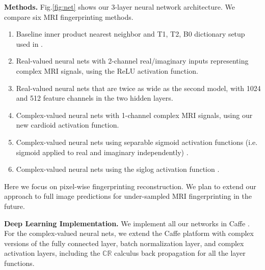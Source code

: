 \documentclass{article}
\begin{document}
{\bf Methods.}  Fig.\ref{fig:net} shows our 3-layer neural network architecture.  We compare six MRI fingerprinting methods.
\begin{enumerate}
\setlength{\itemsep}{0pt}
\item Baseline inner product nearest neighbor and T1, T2, B0 dictionary setup used in \cite{mrf_nature}.
\item Real-valued neural nets with 2-channel real/imaginary inputs representing complex MRI signals, using the ReLU activation function.
\item Real-valued neural nets that are twice as wide as the second model, with 1024 and 512 feature channels in the two hidden layers.
\item Complex-valued neural nets with 1-channel complex MRI signals, using our new cardioid activation function.
\item Complex-valued neural nets using separable sigmoid activation functions (i.e. sigmoid applied to real and imaginary independently) \cite{complex_backprop_nitta}.
\item Complex-valued neural nets using the siglog activation function \cite{complex_backprop_georgiou}.
\end{enumerate}
Here we focus on pixel-wise fingerprinting reconstruction.  We plan to extend our approach to full image predictions for under-sampled MRI fingerprinting in the future.


{\bf Deep Learning Implementation.}
 We implement all our networks in Caffe \cite{caffe}.  For the complex-valued neural nets, we extend the Caffe platform with complex versions of the fully connected layer, batch normalization layer, and complex activation layers, including the $\mathbb{CR}$ calculus back propagation for all the layer functions.




\end{document}
